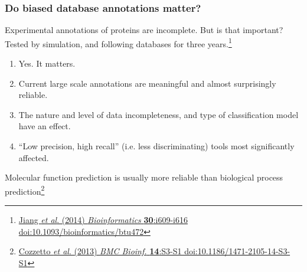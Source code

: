 \begin{frame}
  \frametitle{Do biased database annotations matter?}
  Experimental annotations of proteins are incomplete. But is that important?\\
  Tested by simulation, and following databases for three years.\footnote{\tiny{\href{http://dx.doi.org/10.1093/bioinformatics/btu472}{Jiang \textit{et al}. (2014) \textit{Bioinformatics} \textbf{30}:i609-i616 doi:10.1093/bioinformatics/btu472}}}
  \begin{enumerate}
    \item Yes. It matters.
    \item Current large scale annotations are meaningful and almost surprisingly reliable.
    \item The nature and level of data incompleteness, and type of classification model have an effect.
    \item ``Low precision, high recall'' (i.e. less discriminating) tools most significantly affected.
  \end{enumerate}
  Molecular function prediction is usually more reliable than biological process prediction\footnote{\tiny{\href{http://dx.doi.org/10.1186/1471-2105-14-S3-S1}{Cozzetto \textit{et al}. (2013) \textit{BMC Bioinf.} \textbf{14}:S3-S1 doi:10.1186/1471-2105-14-S3-S1}}}
\end{frame}

